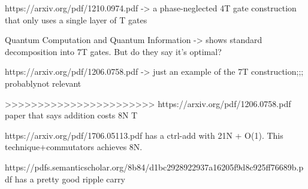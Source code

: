 \documentclass[twocolumn,longbibliography]{quantumarticle-customized}
\begin{document}
https://arxiv.org/pdf/1210.0974.pdf  ->   a phase-neglected 4T gate construction that only uses a single layer of T gates


Quantum Computation and Quantum Information -> shows standard decomposition into 7T gates. But do they say it's optimal?

https://arxiv.org/pdf/1206.0758.pdf -> just an example of the 7T construction;;; probablynot relevant




>>>>>>>>>>>>>>>>>>>>>>> https://arxiv.org/pdf/1206.0758.pdf          paper that says addition costs 8N T


https://arxiv.org/pdf/1706.05113.pdf   has a ctrl-add with 21N + O(1). This technique+commutators achieves 8N.


https://pdfs.semanticscholar.org/8b84/d1bc2928922937a16205f9d8c925ff76689b.pdf     has a pretty good ripple carry
\end{document}
